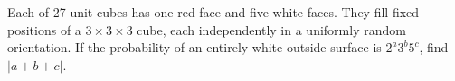 Each of 27 unit cubes has one red face and five white faces. They fill fixed positions of a $3\times3\times3$ cube, each independently in a uniformly random orientation. If the probability of an entirely white outside surface is $2^a3^b5^c$, find $|a+b+c|$.
